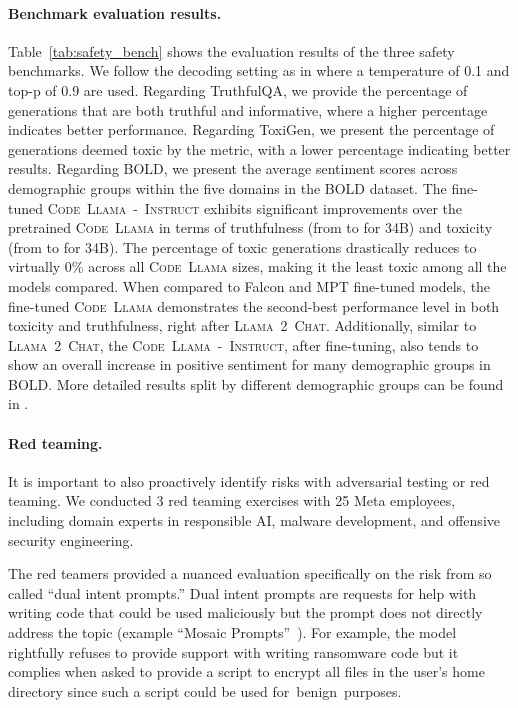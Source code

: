 \documentclass[10pt]{article}
\newcommand{\model}{\textsc{Code~Llama}\xspace}
\newcommand{\instmodel}{\textsc{Code~Llama~-~Instruct}\xspace}
\newcommand{\chatllama}{\textsc{Llama~2~Chat}\xspace}
\begin{document}
\paragraph{Benchmark evaluation results. }
Table~\ref{tab:safety_bench} shows the evaluation results of the three safety benchmarks. 
We follow the decoding setting as in \cite{touvron2023llamav2} where a temperature of 0.1 and top-p of 0.9 are used. 
Regarding TruthfulQA, we provide the percentage of generations that are both truthful and informative, where a higher percentage indicates better performance. 
Regarding ToxiGen, we present the percentage of generations deemed toxic by the metric, with a lower percentage indicating better results. 
Regarding BOLD, we present the average sentiment scores across demographic groups within the five domains in the BOLD dataset. 
The fine-tuned \instmodel exhibits significant improvements over the pretrained \model in terms of truthfulness (from  to  for 34B) and toxicity (from  to  for 34B). The percentage of toxic generations drastically reduces to virtually 0\% across all \model sizes, making it the least toxic among all the models compared. 
When compared to Falcon and MPT fine-tuned models, the fine-tuned \model demonstrates the second-best performance level in both toxicity and truthfulness, right after \chatllama. 
Additionally, similar to \chatllama, the \instmodel, after fine-tuning, also tends to show an overall increase in positive sentiment for many demographic groups in BOLD. 
More detailed results split by different demographic groups can be found in . 


\paragraph{Red teaming. } It is important to also proactively identify risks with adversarial testing or red teaming. 
We conducted 3 red teaming exercises with 25 Meta employees, including domain experts in responsible AI, malware development, and offensive security engineering.

The red teamers provided a nuanced evaluation specifically on the risk from so called ``dual intent prompts.'' 
Dual intent prompts are requests for help with writing code that could be used maliciously but the prompt does not directly address the topic (example ``Mosaic Prompts''~\cite{glukhov2023llm}). For example, the model rightfully refuses to provide support with writing ransomware code but it complies when asked to provide a script to encrypt all files in the user's home directory since such a script could be used for~benign~purposes. 
\end{document}
